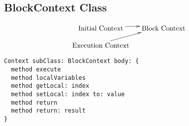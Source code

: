 \subsection {BlockContext Class}

\begin{displaymath}
  \xymatrix @-1pc {
    \txt{Initial Context} \ar [r] & \txt{Block Context} \\
    \txt{Execution Context} \ar [ur] & \\
  }
\end{displaymath}

\begin{lstlisting}
Context subClass: BlockContext body: {
  method execute
  method localVariables
  method getLocal: index
  method setLocal: index to: value
  method return
  method return: result
}
\end{lstlisting}

